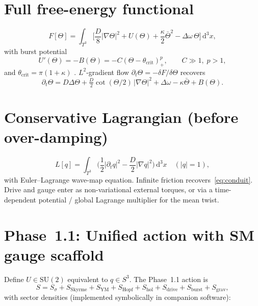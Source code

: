 \documentclass[11pt]{article}
\begin{document}
\section{Full free-energy functional}

\begin{equation}
F[\Theta]
=\int_{T^3}\Biggl[
\frac{D}{8}|\nabla\Theta|^2
+U(\Theta)
+\frac{\kappa}{2}\bar\Theta^2
-\Delta\omega\,\Theta
\Biggr]\,\mathrm{d}^3x,
\label{eq:free-energy}
\end{equation}
with burst potential
\[
U'(\Theta)=-B(\Theta)=-C(\Theta-\theta_{\mathrm{crit}})_+^{p},
\qquad C\gg 1,\; p>1,
\]
and $\theta_{\mathrm{crit}}=\pi(1+\kappa)$ \cite{burst}.
$L^2$-gradient flow $\partial_t\Theta=-\delta F/\delta\Theta$ recovers
\begin{equation}
\partial_t\Theta
=D\Delta\Theta
+\tfrac{D}{2}\cot(\Theta/2)\,|\nabla\Theta|^2
+\Delta\omega
-\kappa\bar\Theta
+B(\Theta).
\label{eq:conduit}
\end{equation}

\section{Conservative Lagrangian (before over-damping)}

\begin{equation}
L[q]=\int_{T^3}\Biggl(
\frac{1}{2}|\partial_t q|^2
-\frac{D}{2}|\nabla q|^2
\Biggr)\,\mathrm{d}^3x
\quad(|q|=1),
\label{eq:wave-map}
\end{equation}
with Euler--Lagrange wave-map equation. Infinite friction recovers~\eqref{eq:conduit}.
Drive and gauge enter as non-variational external torques, or via a time-dependent
potential / global Lagrange multiplier for the mean twist.

\section{Phase~1.1: Unified action with SM gauge scaffold}

Define $U\in\mathrm{SU}(2)$ equivalent to $q\in S^3$. The Phase~1.1 action is
\begin{equation}
S=S_\sigma+S_{\mathrm{Skyrme}}+S_{\mathrm{YM}}
+S_{\mathrm{Hopf}}+S_{\mathrm{hol}}+S_{\mathrm{drive}}
+S_{\mathrm{burst}}+S_{\mathrm{grav}},
\label{eq:unified-action}
\end{equation}
with sector densities (implemented symbolically in companion software):
\end{document}
